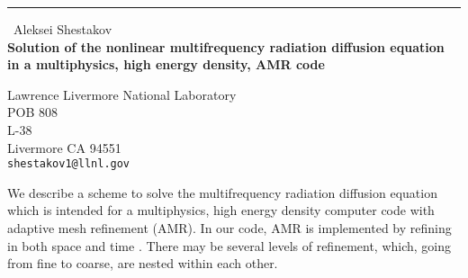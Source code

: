 \documentclass{report}
\begin{document}
\begin{center}
\rule{6in}{1pt} \
{\large Aleksei Shestakov \\
{\bf Solution of the nonlinear multifrequency radiation diffusion equation in a multiphysics, high energy density, AMR code}}

Lawrence Livermore National Laboratory \\ POB 808 \\ L-38 \\ Livermore CA 94551
\\
{\tt shestakov1@llnl.gov}\end{center}


\newcommand{\be}{\begin{equation}}
\newcommand{\ee}{\end{equation}}
\newcommand{\bey}{\begin{eqnarray}}
\newcommand{\eey}{\end{eqnarray}}

\newcommand{\pref}[1]{(\ref{#1})}

\newcommand{\cv}{c_v }
\newcommand{\doo}{\partial \Omega }
\newcommand{\doc}{\partial \Omega_c }
\newcommand{\dof}{\partial \Omega_f }
\newcommand{\dfcf}{\delta F_{cf} }
\newcommand{\dfi}{\delta F_i }
\newcommand{\dg}{\Delta_g}
\newcommand{\dk}{\Delta_k}
\newcommand{\dt}{\Delta t}
\newcommand{\dtc}{\Delta t_{c}}
\newcommand{\dtf}{\Delta t_{f}}
\newcommand{\fIm}{F_{I-1/2} }
\newcommand{\fim}{F_{i-1/2} }
\newcommand{\fip}{F_{i+1/2} }
\newcommand{\fjm}{F_{j-1/2} }
\newcommand{\fjp}{F_{j+1/2} }
\newcommand{\fJp}{F_{J+1/2} }
\newcommand{\gb}{\beta }
\newcommand{\gbf}{\beta_f }
\newcommand{\gk}{\kappa }
\newcommand{\gl}{\lambda }
\newcommand{\glf}{\lambda_f }
\newcommand{\oc}{\Omega_c }
\newcommand{\of}{\Omega_f }
\newcommand{\zl}{\zeta_{\ell}}


We describe a scheme to solve the
multifrequency radiation diffusion equation
which is intended for a
multiphysics, high energy density computer code
with adaptive mesh refinement (AMR). In our code,
AMR is implemented by refining in both space and time
\cite{HowGre}. There may be several levels of refinement,
which, going from fine to coarse, are nested
within each other.
\end{document}
